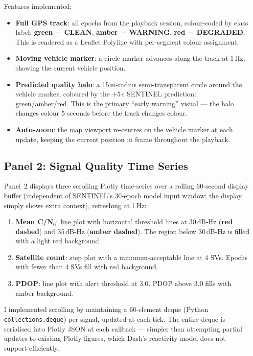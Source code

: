\documentclass[12pt,a4paper]{article}
\newcommand{\code}[1]{\texttt{#1}}
\newcommand{\clean}[1]{\textcolor{cleanGreen}{\textbf{#1}}}
\newcommand{\warn}[1]{\textcolor{warnOrange}{\textbf{#1}}}
\newcommand{\degrad}[1]{\textcolor{degradRed}{\textbf{#1}}}
\begin{document}
Features implemented:
\begin{itemize}
  \item \textbf{Full GPS track}: all epochs from the playback session, colour-coded by
    class label: \clean{green = CLEAN}, \warn{amber = WARNING}, \degrad{red = DEGRADED}.
    This is rendered as a Leaflet Polyline with per-segment colour assignment.
  \item \textbf{Moving vehicle marker}: a circle marker advances along the track at
    1\,Hz, showing the current vehicle position.
  \item \textbf{Predicted quality halo}: a 15\,m-radius semi-transparent circle
    around the vehicle marker, coloured by the $+5$\,s SENTINEL prediction:
    green/amber/red.
    This is the primary ``early warning'' visual --- the halo changes colour 5 seconds
    before the track changes colour.
  \item \textbf{Auto-zoom}: the map viewport re-centres on the vehicle marker at each
    update, keeping the current position in frame throughout the playback.
\end{itemize}

\subsection{Panel 2: Signal Quality Time Series}

Panel~2 displays three scrolling Plotly time-series over a rolling 60-second display
buffer (independent of SENTINEL's 30-epoch model input window; the display simply shows
extra context), refreshing at 1\,Hz:

\begin{enumerate}
  \item \textbf{Mean C/N$_0$}: line plot with horizontal threshold lines at 30\,dB-Hz
    (\degrad{red dashed}) and 35\,dB-Hz (\warn{amber dashed}).
    The region below 30\,dB-Hz is filled with a light red background.
  \item \textbf{Satellite count}: step plot with a minimum-acceptable line at 4 SVs.
    Epochs with fewer than 4 SVs fill with red background.
  \item \textbf{PDOP}: line plot with alert threshold at 3.0.
    PDOP above 3.0 fills with amber background.
\end{enumerate}

I implemented scrolling by maintaining a 60-element deque (Python \code{collections.deque})
per signal, updated at each tick.
The entire deque is serialised into Plotly JSON at each callback --- simpler than
attempting partial updates to existing Plotly figures, which Dash's reactivity model
does not support efficiently.
\end{document}
